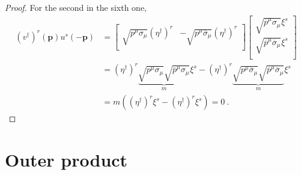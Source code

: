 \begin{proof}
        For the second in the sixth one, 
        \begin{equation*}
        \begin{aligned}
            (v^\dagger)^r (\mathbf p) u^s (- \mathbf p) & = \begin{bmatrix}
                \sqrt{p^\mu \sigma_\mu} (\eta^\dagger)^r & - \sqrt{p^\mu \overline \sigma_\mu} (\eta^\dagger)^r \\
            \end{bmatrix} \begin{bmatrix}
                \sqrt{\overline p^\mu \sigma_\mu} \xi^s \\ \sqrt{\overline p^\mu \overline \sigma_\mu} \xi^s \\
            \end{bmatrix} \\ & = (\eta^\dagger)^r \underbrace{\sqrt{p^\mu \sigma_\mu} \sqrt{\overline p^\mu \sigma_\mu}}_m \xi^s - (\eta^\dagger)^r \underbrace{\sqrt{p^\mu \overline \sigma_\mu} \sqrt{\overline p^\mu \overline \sigma_\mu}}_m \xi^s \\ & = m ((\eta^\dagger)^r \xi^s - (\eta^\dagger)^r \xi^s) = 0 ~.
        \end{aligned}
        \end{equation*}
    \end{proof}

\section{Outer product}

